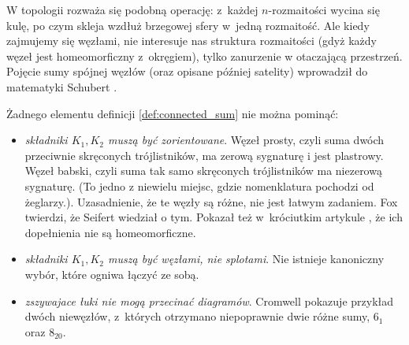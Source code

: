 \begin{definition}
\begin{comment}
            \strand[thick] (-5, -2) [in=right, out=left] to (-10.5, -10);
            \strand[thick] (-10.5, -10) [in=down, out=left] to (-18.5, -3.5);
            \strand[thick] (11.5, -3.5) [in=down, out=up] to (18.5, 3.5);
            \strand[thick] (-10 +15, 2) [in=left, out=right] to (15, 6.5);
            \strand[thick] (10.5, -10) [in=down, out=right] to (18.5, -3.5);
            \strand[thick] (18.5, -3.5) [in=down, out=up] to (11.5, 3.5);
            \strand[thick] (25, -3.5) [in=right, out=up] to (15, 6.5);
            \strand[thick] (25, -3.5) [in=right, out=down] to (19.5, -10);
            \strand[thick] (19.5, -10) [in=down, out=left] to (11.5, -3.5);
            \strand[thick] (11.5, 3.5) [in=left, out=up] to (15, 10);
            \strand[thick] (18.5, 3.5) [in=right, out=up] to (15, 10);
            \node at (0, -15) {$K_1 \shrap K_2$};
        \end{knot}
        \end{tikzpicture}
    \]
\end{comment}
\end{definition}

W topologii rozważa się podobną operację: z~każdej $n$-rozmaitości wycina się kulę, po czym skleja wzdłuż brzegowej sfery w~jedną rozmaitość.
Ale kiedy zajmujemy się węzłami, nie interesuje nas struktura rozmaitości (gdyż każdy węzeł jest homeomorficzny z~okręgiem), tylko zanurzenie w otaczającą przestrzeń.
Pojęcie sumy spójnej węzłów (oraz opisane później satelity) wprowadził do matematyki Schubert \cite{schubert1949}.
%

Żadnego elementu definicji \ref{def:connected_sum} nie można pominąć:
\begin{itemize}
    \item \emph{składniki $K_1, K_2$ muszą być zorientowane}. 
    Węzeł prosty, czyli suma dwóch przeciwnie skręconych trójlistników, ma zerową sygnaturę i jest plastrowy.
    Węzeł babski, czyli suma tak samo skręconych trójlistników ma niezerową sygnaturę.
    (To jedno z niewielu miejsc, gdzie nomenklatura pochodzi od żeglarzy.).
    \label{two_sums_of_two_trefoils}%
    Uzasadnienie, że te węzły są różne, nie jest łatwym zadaniem.
    Fox twierdzi, że Seifert \cite{seifert1933} wiedział o tym.
    Pokazał też w~króciutkim artykule \cite{fox1952}, że ich dopełnienia nie są homeomorficzne.
    \item \emph{składniki $K_1, K_2$ muszą być węzłami, nie splotami}. Nie istnieje kanoniczny wybór, które ogniwa łączyć ze sobą.
    \item \emph{zszywajace łuki nie mogą przecinać diagramów}.
    Cromwell \cite[s. 90]{cromwell2004} pokazuje przykład dwóch niewęzłów, z~których otrzymano niepoprawnie dwie różne sumy, $6_1$ oraz $8_{20}$.
\end{itemize}

